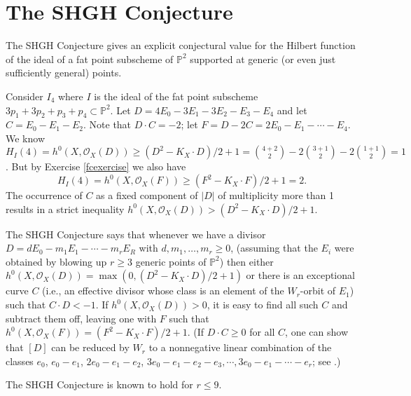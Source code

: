 \documentclass[11pt,twoside]{amsart}
\numberwithin{equation}{section}
\theoremstyle{definition}
\begin{document}
\section{The SHGH Conjecture}

The SHGH Conjecture \cite{refSe,refVanc,refG,refHi} gives an explicit
conjectural value for the Hilbert function of the ideal of a fat point subscheme of ${\mathbb{P}^{2}}$
supported at generic (or even just sufficiently general) points. 

Consider $I_4$ where $I$ is the ideal of the fat point subscheme $3p_1+3p_2+p_3+p_4\subset{\mathbb{P}^{2}}$.
Let $D=4E_0-3E_1-3E_2-E_3-E_4$ and let $C=E_0-E_1-E_2$.
Note that $D\cdot C=-2$; let $F=D-2C=2E_0-E_1-\cdots-E_4$.
We know $H_I(4)=h^0(X,{{\mathcal O}}_X(D))\geq (D^2-K_X\cdot D)/2+1=
\binom{4+2}{2}-2\binom{3+1}{2}-2\binom{1+1}{2}=1$.
But by Exercise \ref{fcexercise} we also have 
$$H_I(4)=h^0(X,{{\mathcal O}}_X(F))\geq (F^2-K_X\cdot F)/2+1=2.$$
The occurrence of $C$ as a fixed component of $|D|$ of multiplicity more than 1 results in
a strict inequality $h^0(X,{{\mathcal O}}_X(D))>(D^2-K_X\cdot D)/2+1$.

The SHGH Conjecture says that whenever we have a divisor $D=dE_0-m_1E_1-\cdots-m_rE_R$
with $d,m_1,\ldots,m_r\geq 0$,
(assuming that the $E_i$ were obtained by blowing up $r\geq 3$ generic points of ${\mathbb{P}^{2}}$)
then either $h^0(X,{{\mathcal O}}_X(D))=\max(0,(D^2-K_X\cdot D)/2+1)$ or there is an exceptional curve
$C$ (i.e., an effective divisor whose class is an element of the $W_r$-orbit of $E_1$)
such that $C\cdot D<-1$. If $h^0(X,{{\mathcal O}}_X(D))>0$, it is easy to find all such $C$
and subtract them off, leaving one with $F$ such that
$h^0(X,{{\mathcal O}}_X(F))=(F^2-K_X\cdot F)/2+1$. (If $D\cdot C\geq 0$ for all $C$, one can show that 
$[D]$ can be reduced by $W_r$ to a nonnegative linear combination of the classes
$e_0$, $e_0-e_1$, $2e_0-e_1-e_2$, $3e_0-e_1-e_2-e_3, \cdots, 3e_0-e_1-\cdots-e_r$;
see \cite{refDuke}.)

The SHGH Conjecture is known to hold for $r\leq 9$.
\end{document}
